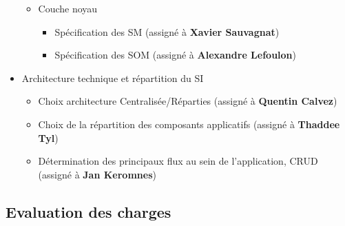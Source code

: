 \begin{itemize}
\begin{itemize}
\item Couche noyau

\begin{itemize}
\item Spécification des SM (assigné à \textbf{Xavier Sauvagnat})
\item Spécification des SOM (assigné à \textbf{Alexandre Lefoulon})
\end{itemize}

\end{itemize}

\item Architecture technique et répartition du SI

\begin{itemize}
\item Choix architecture Centralisée/Réparties (assigné à \textbf{Quentin Calvez})
\item Choix de la répartition des composants applicatifs (assigné à \textbf{Thaddee Tyl})
\item Détermination des principaux flux au sein de l'application, CRUD (assigné à \textbf{Jan Keromnes})
\end{itemize}

\end{itemize}

\subsection{Evaluation des charges}

